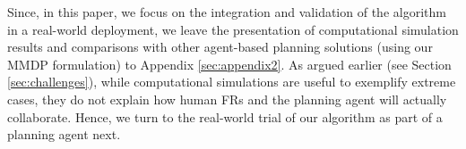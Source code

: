 Since, in this paper, we focus on the integration and validation of the algorithm in a real-world deployment, we leave the presentation of  computational simulation results and comparisons with other agent-based planning solutions (using our MMDP formulation) to Appendix \ref{sec:appendix2}. As argued earlier (see Section \ref{sec:challenges}), while computational simulations are useful to exemplify extreme cases, they do not explain how human FRs and the planning agent will actually collaborate. Hence, we turn to the real-world trial of our algorithm as part of a planning agent next.


